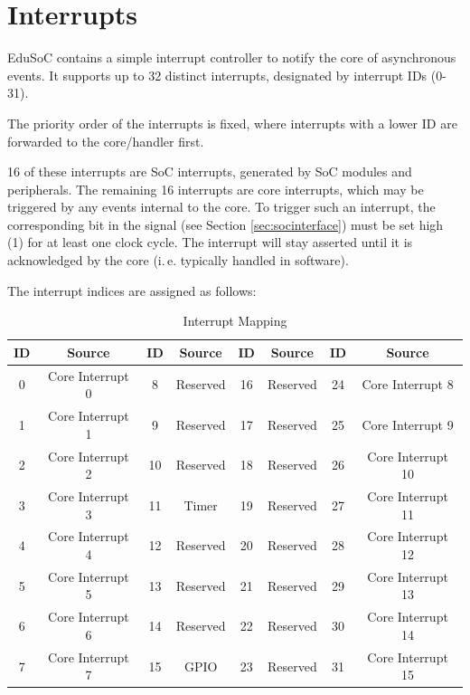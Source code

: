 \section{Interrupts}\label{sec:interrupts}
EduSoC contains a simple interrupt controller to notify the core of asynchronous events. It supports up to 32 distinct interrupts, designated by interrupt IDs (0-31).

The priority order of the interrupts is fixed, where interrupts with a lower ID are forwarded to the core/handler first.

16 of these interrupts are SoC interrupts, generated by SoC modules and peripherals. The remaining 16 interrupts are core interrupts, which may be triggered by any events internal to the core.
To trigger such an interrupt, the corresponding bit in the  signal (see Section \ref{sec:socinterface}) must be set high (1) for at least one clock cycle. The interrupt will stay asserted until it is acknowledged by the core (i.\,e. typically handled in software).

The interrupt indices are assigned as follows:\\
\begin{table}[H]
    \centering
    \begin{tabular}{|c|c||c|c||c|c||c|c|}\hline
        ID & Source & ID & Source & ID & Source & ID & Source \\\hline\hline
        \cellcolor{blue!25}0 & \cellcolor{blue!25}Core Interrupt 0 & 8 & Reserved & 16 & Reserved & \cellcolor{blue!25}24 & \cellcolor{blue!25}Core Interrupt 8 \\
        \cellcolor{blue!25}1 & \cellcolor{blue!25}Core Interrupt 1 & 9 & Reserved & 17 & Reserved & \cellcolor{blue!25}25 & \cellcolor{blue!25}Core Interrupt 9 \\
        \cellcolor{blue!25}2 & \cellcolor{blue!25}Core Interrupt 2 & 10 & Reserved & 18 & Reserved & \cellcolor{blue!25}26 & \cellcolor{blue!25}Core Interrupt 10 \\
        \cellcolor{blue!25}3 & \cellcolor{blue!25}Core Interrupt 3 & \cellcolor{red!25}11 & \cellcolor{red!25}Timer & 19 & Reserved & \cellcolor{blue!25}27 & \cellcolor{blue!25}Core Interrupt 11 \\
        \cellcolor{blue!25}4 & \cellcolor{blue!25}Core Interrupt 4 & 12 & Reserved & 20 & Reserved & \cellcolor{blue!25}28 & \cellcolor{blue!25}Core Interrupt 12 \\
        \cellcolor{blue!25}5 & \cellcolor{blue!25}Core Interrupt 5 & 13 & Reserved & 21 & Reserved & \cellcolor{blue!25}29 & \cellcolor{blue!25}Core Interrupt 13 \\
        \cellcolor{blue!25}6 & \cellcolor{blue!25}Core Interrupt 6 & 14 & Reserved & 22 & Reserved & \cellcolor{blue!25}30 & \cellcolor{blue!25}Core Interrupt 14 \\
        \cellcolor{blue!25}7 & \cellcolor{blue!25}Core Interrupt 7 & \cellcolor{green!25}15 & \cellcolor{green!25}GPIO & 23 & Reserved & \cellcolor{blue!25}31 & \cellcolor{blue!25}Core Interrupt 15 \\\hline
    \end{tabular}
    \caption{Interrupt Mapping}
    \label{tab:interrupts}
\end{table}

